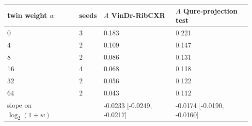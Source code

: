 \begin{tabular}{llll}
\toprule
twin weight $w$ & seeds & $A$ VinDr-RibCXR & $A$ Qure-projection test \\
\midrule
0 & 3 & 0.183 & 0.221 \\
4 & 2 & 0.109 & 0.147 \\
8 & 2 & 0.086 & 0.131 \\
16 & 4 & 0.068 & 0.118 \\
32 & 2 & 0.056 & 0.122 \\
64 & 2 & 0.043 & 0.112 \\
slope on $\log_2(1+w)$ &  & -0.0233 [-0.0249, -0.0217] & -0.0174 [-0.0190, -0.0160] \\
\bottomrule
\end{tabular}
